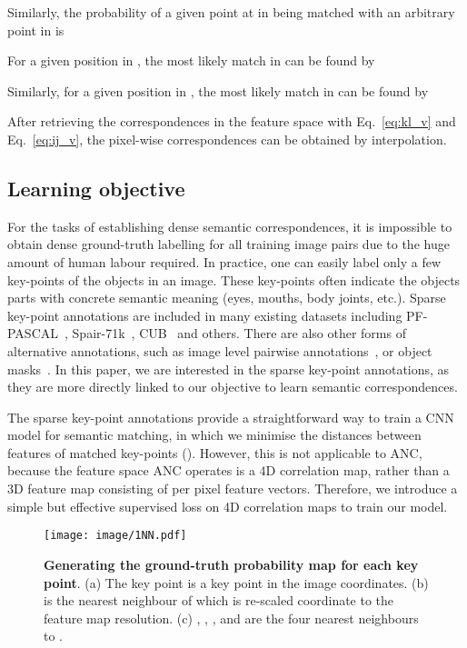 \documentclass[10pt,twocolumn,letterpaper]{article}
\begin{document}
Similarly, the probability of a given point at  in  being matched with an arbitrary point   in  is

For a given position  in ,  the most likely match  in  can be found by 

Similarly, for a given position  in , the most likely match  in  can be found by 

After retrieving the correspondences in the feature space with Eq.~\ref{eq:kl_v} and Eq.~\ref{eq:ij_v}, the pixel-wise correspondences can be obtained by interpolation. 

\subsection{Learning objective}
\label{sec:loss}
For the tasks of establishing dense semantic correspondences, it is impossible to obtain dense ground-truth labelling for all training image pairs due to the huge amount of human labour required. 
In practice, one can easily label only a few key-points of the objects in an image.
These key-points often indicate the objects parts with concrete semantic meaning (\eg eyes, mouths, body joints, etc.).
Sparse key-point annotations are included in many existing datasets including PF-PASCAL~\cite{ham2018proposal_flow}, Spair-71k~\cite{min2019hyperpixel}, CUB~\cite{Welinder_2010_CUB} and others.
There are also other forms of alternative annotations, such as image level pairwise annotations~\cite{Rocco_NIPS18_NCNet,Huang_ICCV19_DCCNet}, or object masks~\cite{Lee19}.
In this paper, we are interested in the sparse key-point annotations, as they are more directly linked to our objective to learn semantic correspondences.






The sparse key-point annotations provide a straightforward way to train a CNN model for semantic matching, in which we minimise the distances between features of matched key-points (\eg \cite{Choy_NIPS16_UCN}).
However, this is not applicable to ANC, because the feature space ANC operates is a 4D correlation map, rather than a 3D feature map consisting of per pixel feature vectors. Therefore, we introduce a simple but effective supervised loss on 4D correlation maps to train our model. 

\begin{figure}[th]
\centering
  \texttt{[image: image/1NN.pdf]}
   \caption{\textbf{Generating the ground-truth probability map for each key point}. (a) The key point  is a key point in the image coordinates. (b)  is the nearest neighbour of  which is re-scaled coordinate  to the feature map resolution. (c) ,  ,  , and   are the four nearest neighbours to . }
\label{fig:1nn}
\end{figure}
\end{document}
